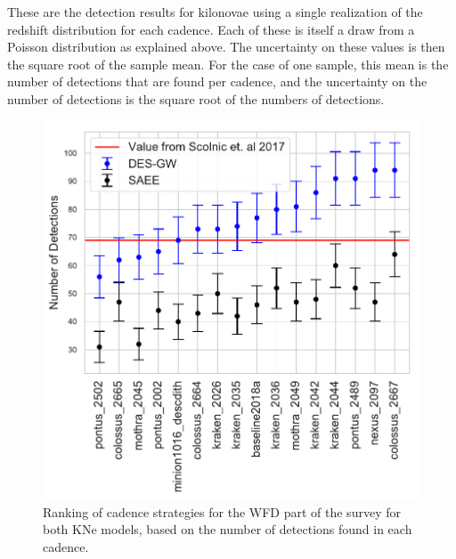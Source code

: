These are the detection results for kilonovae using a single realization of the redshift distribution for each cadence. Each of these is itself a draw from a Poisson distribution as explained above. The uncertainty on these values is then the square root of the sample mean. For the case of one sample, this mean is the number of detections that are found per cadence, and the uncertainty on the number of detections is the square root of the numbers of detections.
\begin{figure}[h!]
  \centering
  \includegraphics[scale=0.79]{figures/wfd_detection_counts_by_cadence}
  \caption{Ranking of cadence strategies for the WFD part of the survey for both KNe models, based on the number of detections found in each cadence.}
  \label{fig:cadence_ranking}
\end{figure}
